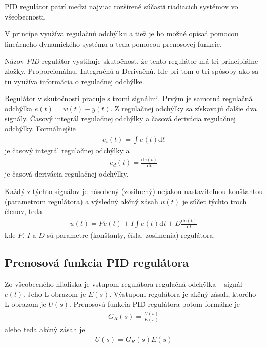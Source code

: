 \documentclass[a4paper, 10pt, ]{article}
\begin{document}
PID regulátor patrí medzi najviac rozšírené súčasti riadiacich systémov vo všeobecnosti.

V princípe využíva regulačnú odchýlku a tiež je ho možné opísať pomocou lineárneho dynamického systému a teda pomocou prenosovej funkcie.

Názov \emph{PID} regulátor vystihuje skutočnosť, že tento regulátor má tri principiálne zložky. Proporcionálnu, Integračnú a Derivačnú. Ide pri tom o tri spôsoby ako sa tu využíva informácia o regulačnej odchýlke.

Regulátor v skutočnosti pracuje s tromi signálmi. Prvým je samotná regulačná odchýlka $e(t) = w(t) - y(t)$. Z regulačnej odchýlky sa získavajú ďalšie dva signály. Časový integrál regulačnej odchýlky a časová derivácia regulačnej odchýlky. Formálnejšie
\begin{align}
    e_i(t) = \int e(t) \text{d}t
\end{align}
je časový integrál regulačnej odchýlky a
\begin{align}
    e_d(t) = \frac{\text{d}e(t)}{\text{d}t}
\end{align}
je časová derivácia regulačnej odchýlky.

Každý z týchto signálov je násobený (zosilnený) nejakou nastaviteľnou konštantou (parametrom regulátora) a výsledný akčný zásah $u(t)$ je súčet týchto troch členov, teda
\begin{align}
    u(t) = P e(t) + I  \int e(t) \text{d}t + D  \frac{\text{d}e(t)}{\text{d}t}
\end{align}
kde $P$, $I$ a $D$ sú parametre (konštanty, čísla, zosilnenia) regulátora.







\subsection{Prenosová funkcia PID regulátora}

Zo všeobecného hľadiska je vstupom regulátora regulačná odchýlka -- signál $e(t)$. Jeho L-obrazom je $E(s)$. Výstupom regulátora je akčný zásah, ktorého L-obrazom je $U(s)$. Prenosová funkcia PID regulátora potom formálne je
\begin{align}
    G_R(s) = \frac{U(s)}{E(s)}
\end{align}
alebo teda akčný zásah je
\begin{align}
    U(s) = G_R(s) E(s)
\end{align}
\end{document}
